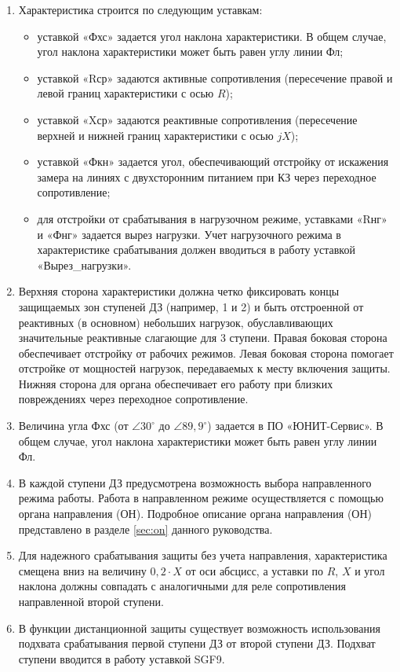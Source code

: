 \begin{enumerate}
\begin{enumerate}
\item
Характеристика строится по следующим уставкам:
\begin{itemize} 
    \item уставкой  «Фхс»  задается  угол  наклона  характеристики.  В  общем  случае,  угол  наклона характеристики может быть равен углу линии Фл; 
    \item уставкой  «Rср»  задаются  активные  сопротивления  (пересечение  правой  и  левой  границ характеристики с осью $R$); 
    \item уставкой  «Xср»  задаются  реактивные  сопротивления  (пересечение  верхней  и  нижней  границ характеристики с осью $jX$); 
    \item уставкой  «Фкн»  задается  угол,  обеспечивающий  отстройку  от  искажения  замера  на  линиях  с двухсторонним питанием при КЗ через переходное сопротивление; 
    \item для отстройки от срабатывания в нагрузочном режиме, уставками «Rнг» и «Фнг» задается вырез нагрузки. Учет нагрузочного режима в характеристике срабатывания должен вводиться в работу уставкой «Вырез\_нагрузки».
\end{itemize}

\item
Верхняя сторона характеристики должна четко фиксировать концы защищаемых зон ступеней ДЗ (например, 1 и 2) и быть отстроенной от реактивных (в основном) небольших нагрузок, обуславливающих  значительные реактивные слагающие для 3 ступени. Правая боковая сторона обеспечивает отстройку от рабочих  режимов.  Левая  боковая  сторона  помогает  отстройке  от  мощностей  нагрузок,  передаваемых  к месту включения защиты. Нижняя сторона для органа обеспечивает его работу при близких повреждениях через переходное сопротивление.
\item
Величина угла Фхс (от $\angle{30^\circ}$ до $\angle{89,9^\circ}$) задается в ПО «ЮНИТ-Сервис». В общем случае, угол наклона характеристики может быть равен углу линии Фл. 
\item
В каждой ступени ДЗ предусмотрена возможность выбора направленного режима работы. Работа в направленном режиме осуществляется  с  помощью  органа направления (ОН). Подробное описание органа направления (ОН) представлено в разделе \ref{sec:on} данного руководства.

\item
Для  надежного  срабатывания  защиты  без  учета  направления,  характеристика  смещена  вниз  на величину $0,2 \cdot X$ от оси абсцисс, а уставки по $R$, $X$ и угол наклона должны совпадать с аналогичными для реле сопротивления направленной второй ступени.
\item
В функции дистанционной защиты существует возможность использования подхвата срабатывания первой ступени ДЗ от второй ступени ДЗ. Подхват ступени вводится в работу уставкой SGF9.


\end{enumerate}
\end{enumerate}
